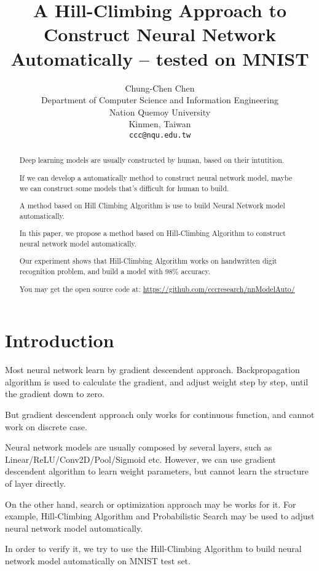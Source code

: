 \documentclass{article}
\title{A Hill-Climbing Approach to Construct Neural Network Automatically -- tested on MNIST}
\author{
  Chung-Chen Chen \\
  Department of Computer Science and Information Engineering\\
  Nation Quemoy University\\
  Kinmen, Taiwan \\
  \texttt{ccc@nqu.edu.tw} \\
}
\begin{document}
\maketitle

\begin{abstract}
Deep learning models are usually constructed by human, based on their intutition.

If we can develop a automatically method to construct neural network model, maybe we can construct some models that's difficult for human to build. 

A method based on Hill Climbing Algorithm is use to build Neural Network model automatically. 

In this paper, we propose a method based on Hill-Climbing Algorithm to construct neural network model automatically.

Our experiment shows that Hill-Climbing Algorithm works on handwritten digit recognition problem, and build a model with 98\% accuracy.

You may get the open source code at: \url{ https://github.com/cccresearch/nnModelAuto/ }

\end{abstract}




\section{Introduction}
Most neural network learn by gradient descendent approach. Backpropagation algorithm is used to calculate the gradient, and adjust weight step by step, until the gradient down to zero. 

But gradient descendent approach only works for continuous function, and cannot work on discrete case.

Neural network models are usually composed by several layers, such as Linear/ReLU/Conv2D/Pool/Sigmoid etc. However, we can use gradient descendent algorithm to learn weight parameters, but cannot learn the structure of layer directly.

On the other hand, search or optimization approach may be works for it. For example, Hill-Climbing Algorithm and Probabilistic Search may be used to adjust neural network model automatically.

In order to verify it, we try to use the Hill-Climbing Algorithm to build neural network model automatically on MNIST test set.
\end{document}
